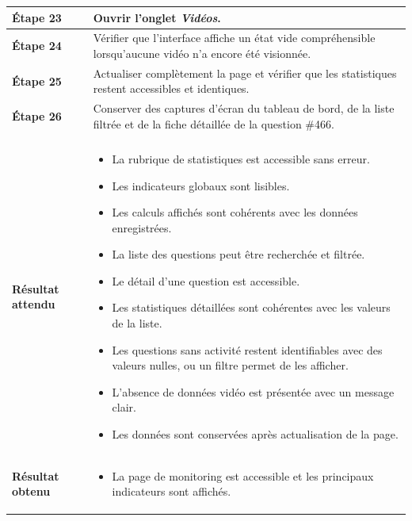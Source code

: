\begin{longtable}{
    |>{\raggedright\arraybackslash}p{}
    |>{\raggedright\arraybackslash}p{}|
}
\textbf{Étape 23}
&
Ouvrir l'onglet \textit{Vidéos}.
\\
\hline

\textbf{Étape 24}
&
Vérifier que l'interface affiche un état vide compréhensible lorsqu'aucune
vidéo n'a encore été visionnée.
\\
\hline

\textbf{Étape 25}
&
Actualiser complètement la page et vérifier que les statistiques restent
accessibles et identiques.
\\
\hline

\textbf{Étape 26}
&
Conserver des captures d'écran du tableau de bord, de la liste filtrée et
de la fiche détaillée de la question \#466.
\\
\hline


\rowcolor{orange!50}
\multicolumn{2}{|c|}{
    \textbf{Résultats du test}
}
\\
\hline

\textbf{Résultat attendu}
&
\begin{itemize}[leftmargin=*,nosep]
    \item La rubrique de statistiques est accessible sans erreur.
    \item Les indicateurs globaux sont lisibles.
    \item Les calculs affichés sont cohérents avec les données enregistrées.
    \item La liste des questions peut être recherchée et filtrée.
    \item Le détail d'une question est accessible.
    \item Les statistiques détaillées sont cohérentes avec les valeurs de
    la liste.
    \item Les questions sans activité restent identifiables avec des valeurs
    nulles, ou un filtre permet de les afficher.
    \item L'absence de données vidéo est présentée avec un message clair.
    \item Les données sont conservées après actualisation de la page.
\end{itemize}
\\
\hline

\textbf{Résultat obtenu}
&
\begin{itemize}[leftmargin=*,nosep]
    \item La page de monitoring est accessible et les principaux indicateurs
    sont affichés.


\end{itemize}
\end{longtable}
